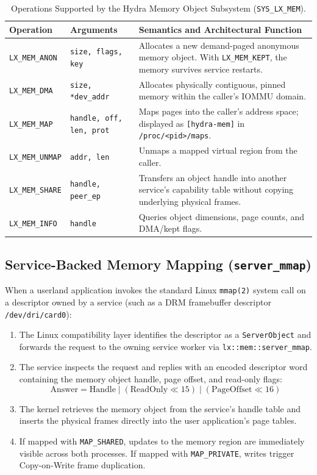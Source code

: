 \begin{table}[htbp]
\centering
\small
\begin{tabularx}{\textwidth}{llX}
\toprule
\textbf{Operation} & \textbf{Arguments} & \textbf{Semantics and Architectural Function} \\
\midrule
\texttt{LX\_MEM\_ANON} & \texttt{size, flags, key} & Allocates a new demand-paged anonymous memory object. With \texttt{LX\_MEM\_KEPT}, the memory survives service restarts. \\
\texttt{LX\_MEM\_DMA} & \texttt{size, *dev\_addr} & Allocates physically contiguous, pinned memory within the caller's IOMMU domain. \\
\texttt{LX\_MEM\_MAP} & \texttt{handle, off, len, prot} & Maps pages into the caller's address space; displayed as \texttt{[hydra-mem]} in \texttt{/proc/<pid>/maps}. \\
\texttt{LX\_MEM\_UNMAP} & \texttt{addr, len} & Unmaps a mapped virtual region from the caller. \\
\texttt{LX\_MEM\_SHARE} & \texttt{handle, peer\_ep} & Transfers an object handle into another service's capability table without copying underlying physical frames. \\
\texttt{LX\_MEM\_INFO} & \texttt{handle} & Queries object dimensions, page counts, and DMA/kept flags. \\
\bottomrule
\end{tabularx}
\caption{Operations Supported by the Hydra Memory Object Subsystem (\texttt{SYS\_LX\_MEM}).}
\label{tab:mem_objects}
\end{table}

\subsection{Service-Backed Memory Mapping (\texttt{server\_mmap})}
When a userland application invokes the standard Linux \texttt{mmap(2)} system call on a descriptor owned by a service (such as a DRM framebuffer descriptor \texttt{/dev/dri/card0}):
\begin{enumerate}
    \item The Linux compatibility layer identifies the descriptor as a \texttt{ServerObject} and forwards the request to the owning service worker via \texttt{lx::mem::server\_mmap}.
    \item The service inspects the request and replies with an encoded descriptor word containing the memory object handle, page offset, and read-only flags:
    \begin{equation}
    \text{Answer} = \text{Handle} \mid (\text{ReadOnly} \ll 15) \mid (\text{PageOffset} \ll 16)
    \end{equation}
    \item The kernel retrieves the memory object from the service's handle table and inserts the physical frames directly into the user application's page tables.
    \item If mapped with \texttt{MAP\_SHARED}, updates to the memory region are immediately visible across both processes. If mapped with \texttt{MAP\_PRIVATE}, writes trigger Copy-on-Write frame duplication.
\end{enumerate}

